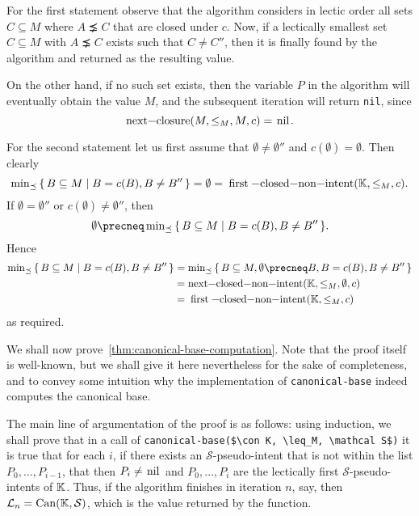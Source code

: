 \begin{Proof}
  For the first statement observe that the algorithm considers in lectic order all sets $C
  \subseteq M$ where $A \precneq C$ that are closed under $c$.  Now, if a lectically
  smallest set $C \subseteq M$ with $A \precneq C$ exists such that $C \neq C''$, then it
  is finally found by the algorithm and returned as the resulting value.

  On the other hand, if no such set exists, then the variable $P$ in the algorithm will
  eventually obtain the value $M$, and the subsequent iteration will return
  \lstinline{nil}, since
  \begin{equation*}
    \text{\lstinline{next-closure}}(M, {\leq_M}, M, c) = \text{\lstinline{nil}}.
  \end{equation*}

  For the second statement let us first assume that $\emptyset \neq \emptyset''$ and
  $c(\emptyset) = \emptyset$.  Then clearly
  \begin{equation*}
    \min\nolimits_{\preceq}\set{ B \subseteq M \mid B = c(B), B \neq B'' } = \emptyset =
    \text{\lstinline{first-closed-non-intent}}(\con K, \leq_M, c).
  \end{equation*}
  If $\emptyset = \emptyset''$ or $c(\emptyset) \neq \emptyset''$, then
  \begin{equation*}
    \emptyset \precneq \min\nolimits_{\preceq}\set{ B \subseteq M \mid B = c(B), B \neq
      B'' }.
  \end{equation*}
  Hence
  \begin{align*}
    \min\nolimits_{\preceq}\set{ B \subseteq M \mid B = c(B), B \neq B'' }
    &= \min\nolimits_{\preceq}\set{ B \subseteq M, \emptyset \precneq B, B = c(B), B \neq
      B''}\\
    &= \text{\lstinline{next-closed-non-intent}}(\con K, \leq_M, \emptyset, c)\\
    &= \text{\lstinline{first-closed-non-intent}}(\con K, \leq_M, c)
  \end{align*}
  as required.
\end{Proof}

We shall now prove~\ref{thm:canonical-base-computation}.  Note that the proof itself is
well-known, but we shall give it here nevertheless for the sake of completeness, and to
convey some intuition why the implementation of \lstinline{canonical-base} indeed computes
the canonical base.

The main line of argumentation of the proof is as follows: using induction, we shall prove
that in a call of \lstinline{canonical-base($\con K, \leq_M, \mathcal S$)} it is true that
for each $i$, if there exists an $\mathcal{S}$-pseudo-intent that is not within the list
$P_0, \dots, P_{i-1}$, that then $P_i \neq \text{\lstinline{nil}}$ and $P_0, \dots, P_i$
are the lectically first $\mathcal{S}$-pseudo-intents of ${\mathbb{K}}$.  Thus, if the algorithm
finishes in iteration $n$, say, then $\mathcal{L}_n = \operatorname{Can}({\mathbb{K}}, \mathcal{S})$, which is
the value returned by the function.

